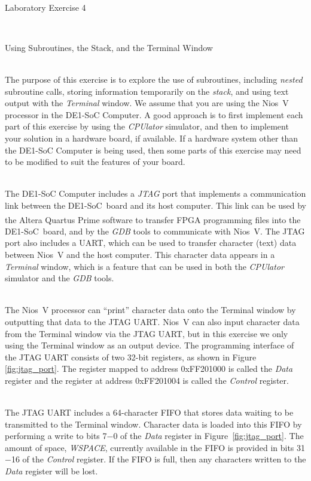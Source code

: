 \documentclass[epsfig,10pt,fullpage]{article}
\begin{document}
~\\
\centerline{\huge Laboratory Exercise 4}
~\\
\centerline{\large Using Subroutines, the Stack, and the Terminal Window}
~\\

\noindent
The purpose of this exercise is to explore the use of subroutines, including {\it nested}
subroutine calls, storing information temporarily on the {\it stack}, and using text output with
the {\it Terminal} window.  We assume that you are using the Nios~V processor in
the DE1-SoC Computer. A good approach is to first implement each part of this exercise by 
using the {\it CPUlator} simulator, and then to implement your solution in a hardware board,
if available. If a hardware system other than the DE1-SoC Computer is being used, then 
some parts of this exercise may need to be modified to suit the features of your board. 

~\\
\noindent
The DE1-SoC Computer includes a {\it JTAG} port that implements a communication link between the 
DE1-SoC~board and its host computer. This link can be used by the Altera 
Quartus\textsuperscript{\textregistered} Prime software to transfer FPGA programming files 
into the DE1-SoC~board, and by the {\it GDB} tools to communicate with Nios~V.  
The JTAG port also includes a UART, which can be used to transfer character (text) data 
between Nios~V and the host computer. This character data appears in a {\it Terminal} window,
which is a feature that can be used in both the {\it CPUlator} simulator and the {\it GDB} tools.

~\\
The Nios~V processor can ``print'' character data onto the Terminal window by outputting that
data to the JTAG UART. Nios~V can also input character data from the Terminal window via
the JTAG UART, but in this exercise we only using the Terminal window as an output device. 
The programming interface of the JTAG UART consists of two 32-bit registers, as shown in 
Figure \ref{fig:jtag_port}. The register mapped to address {\sf 0xFF201000} is called the 
{\it Data} register and the register at address {\sf 0xFF201004} is called the {\it Control}
register.

~\\
The JTAG UART includes a 64-character FIFO that stores data waiting to be transmitted to the 
Terminal window. Character data is loaded into this FIFO by performing a write to bits 7$-$0
of the {\it Data} register in Figure~\ref{fig:jtag_port}. The amount of space, {\it WSPACE},
currently available in the FIFO is provided in bits 31$-$16 of the {\it Control} register. If
the FIFO is full, then any characters written to the {\it Data} register will be lost.
\end{document}
